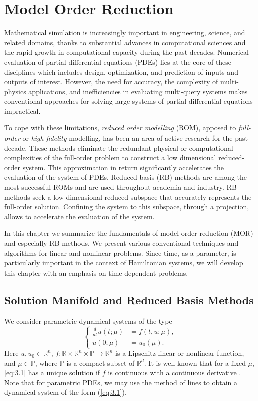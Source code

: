 \chapter{Model Order Reduction} \label{chapter:3}
Mathematical simulation is increasingly important in engineering, science, and related domains, thanks to substantial advances in computational sciences and the rapid growth in computational capacity during the past decades. Numerical evaluation of partial differential equations (PDEs) lies at the core of these disciplines which includes design, optimization, and prediction of inputs and outputs of interest. However, the need for accuracy, the complexity of multi-physics applications, and inefficiencies in evaluating multi-query systems makes conventional approaches for solving large systems of partial differential equations impractical. 

To cope with these limitations, \emph{reduced order modelling} (ROM), apposed to \emph{full-order} or \emph{high-fidelity} modelling, has been an area of active research for the past decade. These methods eliminate the redundant physical or computational complexities of the full-order problem to construct a low dimensional reduced-order system. This approximation in return significantly accelerates the evaluation of the system of PDEs. Reduced basis (RB) methods are among the most successful ROMs and are used throughout academia and industry. RB methods seek a low dimensional reduced subspace that accurately represents the full-order solution. Confining the system to this subspace, through a projection, allows to accelerate the evaluation of the system.

In this chapter we summarize the fundamentals of model order reduction (MOR) and especially RB methods. We present various conventional techniques and algorithms for linear and nonlinear problems. Since time, as a parameter, is particularly important in the context of Hamiltonian systems, we will develop this chapter with an emphasis on time-dependent problems.

\section{Solution Manifold and Reduced Basis Methods} \label{sec:3.1}
We consider parametric dynamical systems of the type
\begin{equation} \label{eq:3.1}
\left\{
\begin{aligned}
	\frac d{dt} u(t;\mu) &= f(t,u;\mu),\\
	u(0;\mu) &= u_0(\mu).
\end{aligned}
\right.
\end{equation}
Here $u,u_0\in \mathbb R^{n}$, $f:\mathbb R \times \mathbb R^{n} \times \mathbb P\to \mathbb R^{n}$ is a Lipschitz linear or nonlinear function, and $\mu \in \mathbb P$, where $\mathbb P$ is a compact subset of $\mathbb R^d$. It is well known that for a fixed $\mu$, \eqref{eq:3.1} has a unique solution if $f$ is continuous with a continuous derivative \cite{rudin1976principles}. Note that for parametric PDEs, we may use the method of lines \cite{edsberg2015introduction} to obtain a dynamical system of the form (\ref{eq:3.1}).

